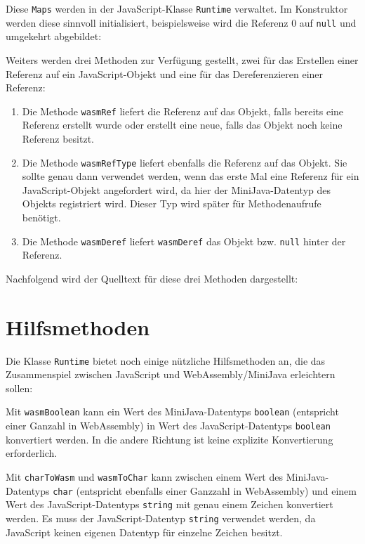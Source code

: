 Diese \lstinline{Maps} werden in der JavaScript-Klasse \lstinline{Runtime} verwaltet. Im Konstruktor werden diese sinnvoll initialisiert, beispielsweise wird die Referenz 0 auf \lstinline{null} und umgekehrt abgebildet:



Weiters werden drei Methoden zur Verfügung gestellt, zwei für das Erstellen einer Referenz auf ein JavaScript-Objekt und eine für das Dereferenzieren einer Referenz:
\begin{enumerate}
    \item Die Methode \lstinline{wasmRef} liefert die Referenz auf das Objekt, falls bereits eine Referenz erstellt wurde oder erstellt eine neue, falls das Objekt noch keine Referenz besitzt.
    \item Die Methode \lstinline{wasmRefType} liefert ebenfalls die Referenz auf das Objekt. Sie sollte genau dann verwendet werden, wenn das erste Mal eine Referenz für ein Ja\-va\-Script-Ob\-jekt angefordert wird, da hier der MiniJava-Datentyp des Objekts registriert wird. Dieser Typ wird später für Methodenaufrufe benötigt.
    \item Die Methode \lstinline{wasmDeref} liefert \lstinline{wasmDeref} das Objekt bzw. \lstinline{null} hinter der Referenz.
\end{enumerate}

Nachfolgend wird der Quelltext für diese drei Methoden dargestellt:



\section{Hilfsmethoden}

Die Klasse \lstinline{Runtime} bietet noch einige nützliche Hilfsmethoden an, die das Zusammenspiel zwischen JavaScript und WebAssembly/MiniJava erleichtern sollen:



Mit \lstinline{wasmBoolean} kann ein Wert des MiniJava-Datentyps \lstinline{boolean} (entspricht einer Ganzahl in WebAssembly) in Wert des JavaScript-Datentyps \lstinline{boolean} konvertiert werden. In die andere Richtung ist keine explizite Konvertierung erforderlich.

Mit \lstinline{charToWasm} und \lstinline{wasmToChar} kann zwischen einem Wert des MiniJava-Datentyps \lstinline{char} (entspricht ebenfalls einer Ganzzahl in WebAssembly) und einem Wert des Ja\-va\-Script-Da\-ten\-typs \lstinline{string} mit genau einem Zeichen konvertiert werden.
Es muss der JavaScript-Datentyp \lstinline{string} verwendet werden, da JavaScript keinen eigenen Datentyp für einzelne Zeichen besitzt.

